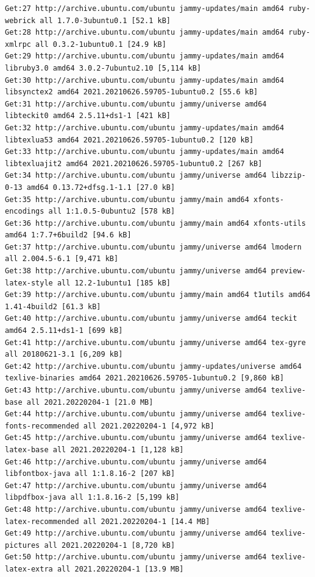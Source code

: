 \documentclass[
  11pt,
  letterpaper,
]{book}
\begin{document}
\begin{verbatim}
Get:27 http://archive.ubuntu.com/ubuntu jammy-updates/main amd64 ruby-webrick all 1.7.0-3ubuntu0.1 [52.1 kB]
Get:28 http://archive.ubuntu.com/ubuntu jammy-updates/main amd64 ruby-xmlrpc all 0.3.2-1ubuntu0.1 [24.9 kB]
Get:29 http://archive.ubuntu.com/ubuntu jammy-updates/main amd64 libruby3.0 amd64 3.0.2-7ubuntu2.10 [5,114 kB]
Get:30 http://archive.ubuntu.com/ubuntu jammy-updates/main amd64 libsynctex2 amd64 2021.20210626.59705-1ubuntu0.2 [55.6 kB]
Get:31 http://archive.ubuntu.com/ubuntu jammy/universe amd64 libteckit0 amd64 2.5.11+ds1-1 [421 kB]
Get:32 http://archive.ubuntu.com/ubuntu jammy-updates/main amd64 libtexlua53 amd64 2021.20210626.59705-1ubuntu0.2 [120 kB]
Get:33 http://archive.ubuntu.com/ubuntu jammy-updates/main amd64 libtexluajit2 amd64 2021.20210626.59705-1ubuntu0.2 [267 kB]
Get:34 http://archive.ubuntu.com/ubuntu jammy/universe amd64 libzzip-0-13 amd64 0.13.72+dfsg.1-1.1 [27.0 kB]
Get:35 http://archive.ubuntu.com/ubuntu jammy/main amd64 xfonts-encodings all 1:1.0.5-0ubuntu2 [578 kB]
Get:36 http://archive.ubuntu.com/ubuntu jammy/main amd64 xfonts-utils amd64 1:7.7+6build2 [94.6 kB]
Get:37 http://archive.ubuntu.com/ubuntu jammy/universe amd64 lmodern all 2.004.5-6.1 [9,471 kB]
Get:38 http://archive.ubuntu.com/ubuntu jammy/universe amd64 preview-latex-style all 12.2-1ubuntu1 [185 kB]
Get:39 http://archive.ubuntu.com/ubuntu jammy/main amd64 t1utils amd64 1.41-4build2 [61.3 kB]
Get:40 http://archive.ubuntu.com/ubuntu jammy/universe amd64 teckit amd64 2.5.11+ds1-1 [699 kB]
Get:41 http://archive.ubuntu.com/ubuntu jammy/universe amd64 tex-gyre all 20180621-3.1 [6,209 kB]
Get:42 http://archive.ubuntu.com/ubuntu jammy-updates/universe amd64 texlive-binaries amd64 2021.20210626.59705-1ubuntu0.2 [9,860 kB]
Get:43 http://archive.ubuntu.com/ubuntu jammy/universe amd64 texlive-base all 2021.20220204-1 [21.0 MB]
Get:44 http://archive.ubuntu.com/ubuntu jammy/universe amd64 texlive-fonts-recommended all 2021.20220204-1 [4,972 kB]
Get:45 http://archive.ubuntu.com/ubuntu jammy/universe amd64 texlive-latex-base all 2021.20220204-1 [1,128 kB]
Get:46 http://archive.ubuntu.com/ubuntu jammy/universe amd64 libfontbox-java all 1:1.8.16-2 [207 kB]
Get:47 http://archive.ubuntu.com/ubuntu jammy/universe amd64 libpdfbox-java all 1:1.8.16-2 [5,199 kB]
Get:48 http://archive.ubuntu.com/ubuntu jammy/universe amd64 texlive-latex-recommended all 2021.20220204-1 [14.4 MB]
Get:49 http://archive.ubuntu.com/ubuntu jammy/universe amd64 texlive-pictures all 2021.20220204-1 [8,720 kB]
Get:50 http://archive.ubuntu.com/ubuntu jammy/universe amd64 texlive-latex-extra all 2021.20220204-1 [13.9 MB]

\end{verbatim}
\end{document}
